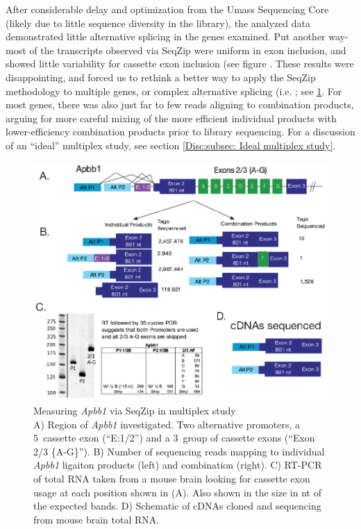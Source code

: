   After considerable delay and optimization from the Umass Sequencing Core (likely due to little sequence diversity in the library), the analyzed data demonstrated little alternative splicing in the genes examined. Put another way- most of the transcripts observed via SeqZip were uniform in exon inclusion, and showed little variability for cassette exon inclusion (see figure . These results were disappointing, and forced us to rethink a better way to apply the SeqZip methodology to multiple genes, or complex alternative splicing (i.e. \dscam{}; see \ref{SeqZipMethod:fig:Apbb1 Results}. For most genes, there was also just far to few reads aligning to combination products, arguing for more careful mixing of the more efficient individual products with lower-efficiency combination products prior to library sequencing. For a discussion of an ``ideal'' multiplex study, see section \ref{Disc:subsec: Ideal multiplex study}.

  \begin{figure} %
    \centering 
    \includegraphics{Figures/SeqZipMethod/Apbb1.eps}
    \caption[Measuring \textit{Apbb1} via SeqZip in multiplex study]
    {
      Measuring \textit{Apbb1} via SeqZip in multiplex study\\[0.25cm]
      A) Region of \textit{Apbb1} investigated. Two alternative promoters, a 5\textprime~cassette exon (``E:1/2'') and a 3\textprime~group of cassette exons (``Exon 2/3 \{A-G\}''). B) Number of sequencing reads mapping to individual \textit{Apbb1} ligaiton products (left) and combination (right). C) RT-PCR of total RNA taken from a mouse brain looking for cassette exon usage at each position shown in (A). Also shown in the size in nt of the expected bands. D) Schematic of cDNAs cloned and sequencing from mouse brain total RNA.
      }
    \label{SeqZipMethod:fig:Apbb1 Results}
    \end{figure}

